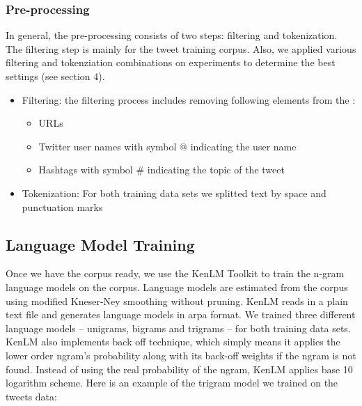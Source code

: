 \documentclass[11pt,a4paper]{article}
\begin{document}
\subsubsection{Pre-processing}
In general, the pre-processing consists of two steps: filtering and tokenization. The filtering step is mainly for the tweet training corpus. Also, we applied various filtering and tokenziation combinations on experiments to determine the best settings (see section 4). 
\begin{itemize}
\item Filtering: the filtering process includes removing following elements from the :
\begin{itemize}
\item URLs
\item Twitter user names with symbol @ indicating the user name
\item Hashtags with symbol \# indicating the topic of the tweet
\end{itemize}
\item Tokenization: For both training data sets we splitted text by space and punctuation marks
\end{itemize}

\subsection{Language Model Training}
Once we have the corpus ready, we use the KenLM Toolkit to train the n-gram language models on the corpus. Language models are estimated from the corpus using modified Kneser-Ney smoothing without pruning. KenLM reads in a plain text file and generates language models in arpa format. We trained three different language models -- unigrams, bigrams and trigrams -- for both training data sets. KenLM also implements back off technique, which simply means it applies the lower order ngram's probability along with its back-off weights if the ngram is not found. Instead of using the real probability of the ngram, KenLM applies base 10 logarithm scheme. Here is an example of the trigram model we trained on the tweets data:
\end{document}
